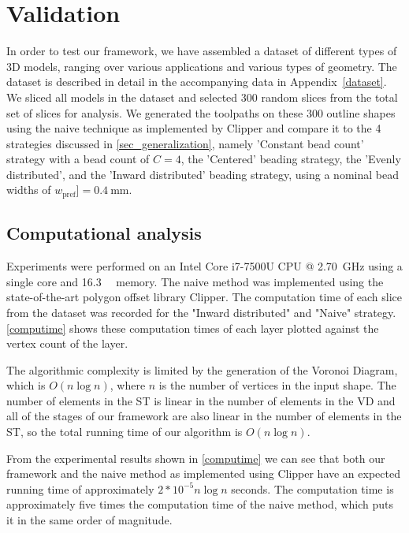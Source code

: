 \section{Validation}
In order to test our framework, we have assembled a dataset of different types of 3D models, ranging over various applications and various types of geometry.
The dataset is described in detail in the accompanying data in Appendix~\ref{dataset}.
We sliced all models in the dataset and selected 300 random slices from the total set of slices for analysis.
We generated the toolpaths on these 300 outline shapes using the naive technique as implemented by Clipper and compare it to the 4 strategies discussed in \cref{sec_generalization}, namely 'Constant bead count' strategy with a bead count of $C=4$, the 'Centered' beading strategy, the 'Evenly distributed', and the 'Inward distributed' beading strategy, using a nominal bead widths of $w_\text{pref}] = \SI{0.4}{\milli\meter}$.



\subsection{Computational analysis}
Experiments were performed on an Intel Core i7-7500U CPU @ \SI{2.70}{\giga\hertz} using a single core and \SI{16.3}{\giga\byte} memory.
The naive method was implemented using the state-of-the-art polygon offset library Clipper. \cite{johnson2014clipper}
The computation time of each slice from the dataset was recorded for the "Inward distributed" and "Naive" strategy. 
\cref{computime} shows these computation times of each layer plotted against the vertex count of the layer.

The algorithmic complexity is limited by the generation of the Voronoi Diagram, which is $O(n \log n)$, where $n$ is the number of vertices in the input shape.
The number of elements in the ST is linear in the number of elements in the VD
and all of the stages of our framework are also linear in the number of elements in the ST,
so the total running time of our algorithm is $O(n \log n)$.

From the experimental results shown in \cref{computime} we can see that both our framework and the naive method as implemented using Clipper have an expected running time of approximately $2*10^{-5} n \log n$ seconds.
The computation time is approximately five times the computation time of the naive method, which puts it in the same order of magnitude.





